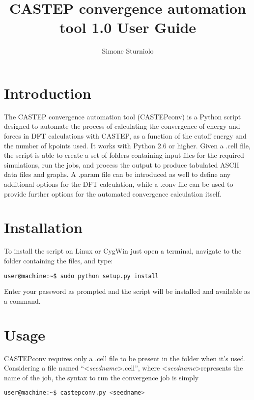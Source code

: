 \documentclass[10pt]{article}
\title{CASTEP convergence automation tool 1.0 User Guide}
\author{Simone Sturniolo}
\begin{document}
\maketitle

\section{Introduction}

The CASTEP convergence automation tool (CASTEPconv) is a Python script designed to automate the process of calculating the convergence of energy and forces in DFT calculations with CASTEP, as a function of the cutoff energy and the number of kpoints used. It works with Python 2.6 or higher. Given a .cell file, the script is able to create a set of folders containing input files for the required simulations, run the jobs, and process the output to produce tabulated ASCII data files and graphs. A .param file can be introduced as well to define any additional options for the DFT calculation, while a .conv file can be used to provide further options for the automated convergence calculation itself.

\section{Installation}

To install the script on Linux or CygWin just open a terminal, navigate to the folder containing the files, and type:

\begin{lstlisting}[language=Bash]
 user@machine:~$ sudo python setup.py install
\end{lstlisting}

Enter your password as prompted and the script will be installed and available as a command.

\section{Usage}

CASTEPconv requires only a .cell file to be present in the folder when it's used. Considering a file named ``\textless \textit{seedname}\textgreater.cell'', where \textless \textit{seedname}\textgreater represents the name of the job, the syntax to run the convergence job is simply

\begin{lstlisting}[language=Bash]
 user@machine:~$ castepconv.py <seedname>
\end{lstlisting}
\end{document}

